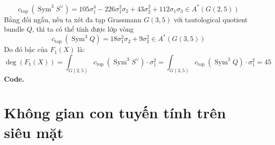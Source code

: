 \documentclass[11pt,a4paper]{book}
\begin{document}
$$c_{\text {top }}\left(\operatorname{Sym}^3 S^{\vee}\right)=105 \sigma_1^4-226 \sigma_1^2 \sigma_2+43 \sigma_2^2+112 \sigma_1 \sigma_3 \in A^*(G(2,5))$$
Bằng đối ngẫu, nếu ta xét đa tạp Grassmann $G(3,5)$ với tautological quotient bundle $Q$, thì ta có thể tính được lớp vòng
$$c_{\text {top }}\left(\operatorname{Sym}^3 Q\right)=18 \sigma_1^2 \sigma_2+9 \sigma_2^2 \in A^*(G(3,5))$$
Do đó bậc của $F_1(X)$ là:
$$\operatorname{deg}\left(F_1(X)\right)=\int_{G(2,5)} c_{\text {top }}\left(\operatorname{Sym}^3 S^{\vee}\right) \cdot \sigma_1^2=\int_{G(3,5)} c_{\text {top }}\left(\operatorname{Sym}^3 Q\right) \cdot \sigma_1^2=45$$
\textbf{Code.}

\section{Không gian con tuyến tính trên siêu mặt}
\end{document}
